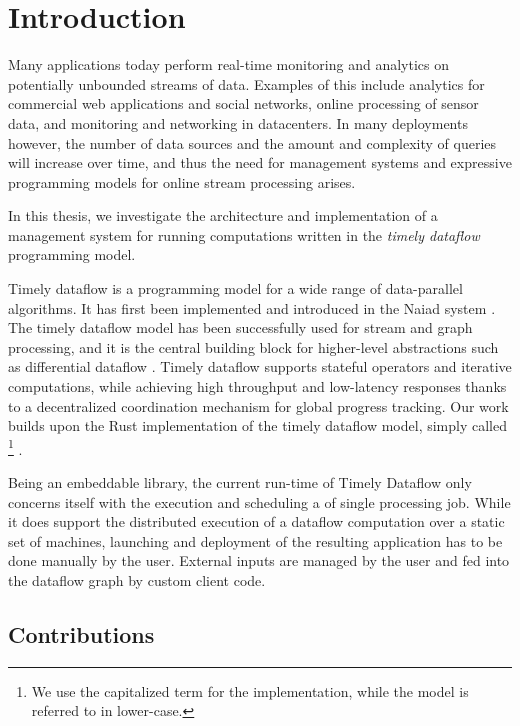 \chapter{Introduction}\label{ch:introduction}

Many applications today perform real-time monitoring and analytics on
potentially unbounded streams of data. Examples of this include analytics for
commercial web applications and social networks, online processing of sensor
data, and monitoring and networking in datacenters. In many deployments however,
the number of data sources and the amount and complexity of queries will increase
over time, and thus the need for management systems and expressive programming
models for online stream processing arises.

\vspace{0.66em}
In this thesis, we investigate the architecture and implementation of a
management system for running computations written in the \emph{timely
dataflow} programming model.
\vspace{0.66em}

Timely dataflow is a programming model for a wide range of data-parallel algorithms.
It has first been implemented and introduced in the Naiad system \cite{naiad}.
The timely dataflow model has been successfully used for stream and graph
processing, and it is the central building block for
higher-level abstractions such as differential dataflow \cite{differential}.
Timely dataflow supports stateful operators and iterative computations, while
achieving high throughput and low-latency responses thanks to a decentralized
coordination mechanism for global progress tracking. Our work
builds upon the Rust implementation of the timely dataflow model,
simply called \footnote{We use the capitalized term
for the implementation, while the model is referred to in lower-case.} \cite{timely}.

Being an embeddable library, the current run-time of Timely Dataflow only
concerns itself with the execution and scheduling a of single processing job.
While it does support the distributed execution of a dataflow computation
over a static set of machines, launching and deployment of the resulting application
has to be done manually by the user. External inputs are managed
by the user and fed into the dataflow graph by custom client code.

\section{Contributions}

